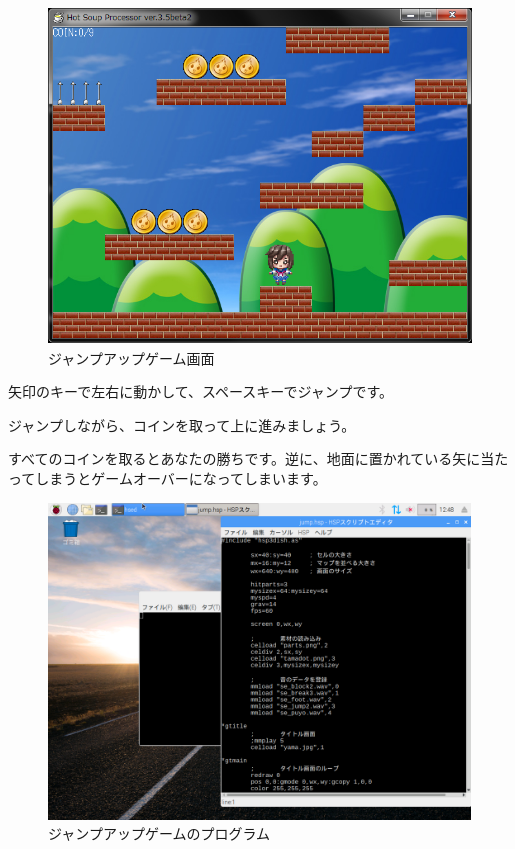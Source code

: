 \begin{figure}[H]
    \begin{center}
      \includegraphics[keepaspectratio,width=11.28cm,height=8.915cm]{text04-img/text04-img023.png}
      \caption{ジャンプアップゲーム画面}
    \end{center}
    \label{fig:prog_menu}
\end{figure}

矢印のキーで左右に動かして、スペースキーでジャンプです。

ジャンプしながら、コインを取って上に進みましょう。

すべてのコインを取るとあなたの勝ちです。逆に、地面に置かれている矢に当たってしまうとゲームオーバーになってしまいます。


\begin{figure}[H]
    \begin{center}
      \includegraphics[keepaspectratio,width=11.192cm,height=8.393cm]{text04-img/text04-img024.png}
      \caption{ジャンプアップゲームのプログラム}
    \end{center}
    \label{fig:prog_menu}
\end{figure}


